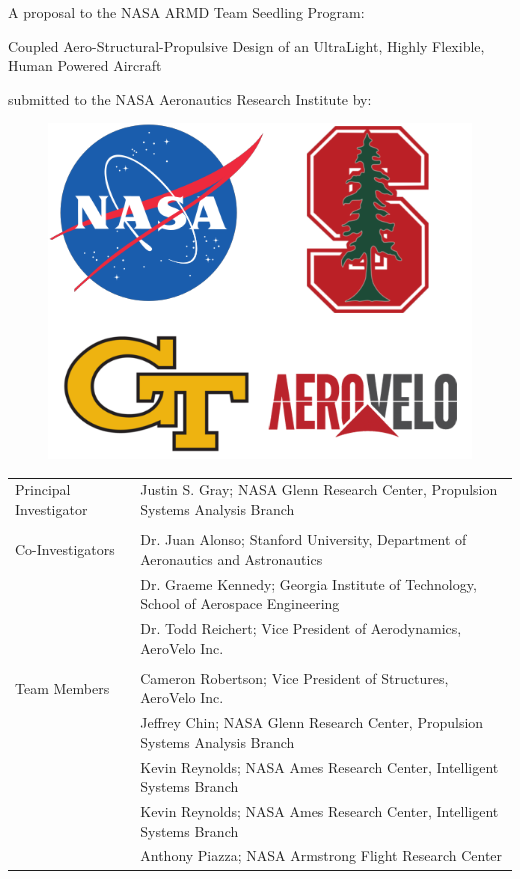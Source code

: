 \documentclass[]{aiaa-tc}
\begin{document}

  \vspace{4em}
  \begin{center}
    A proposal to the NASA ARMD Team Seedling Program: 
    \vspace{2em}

    {\Huge Coupled Aero­-Structural-Propulsive­ Design of an Ultra­Light, Highly Flexible, Human Powered Aircraft}

    \vspace{2em}
    submitted to the NASA Aeronautics Research Institute by: 

    \vspace{3em}
    \begin{figure}
        \centering
        \includegraphics[width=.5\textwidth]{images/seedling_logos}
    \end{figure}
    \vspace{3em}


  \end{center}


  \begin{tabular}{l l}
    Principal Investigator & Justin S. Gray; NASA Glenn Research Center, Propulsion Systems Analysis Branch \\ 
    & \\
    Co-Investigators & Dr. Juan Alonso; Stanford University, Department of Aeronautics and Astronautics \\
                     & Dr. Graeme Kennedy; Georgia Institute of Technology, School of Aerospace Engineering \\ 
                     & Dr. Todd Reichert; Vice President of Aerodynamics, AeroVelo Inc. \\
    & \\ 
    Team Members & Cameron Robertson; Vice President of Structures, AeroVelo Inc. \\ 
                 & Jeffrey Chin; NASA Glenn Research Center, Propulsion Systems Analysis Branch \\
                 & Kevin Reynolds; NASA Ames Research Center, Intelligent Systems Branch \\
                 & Kevin Reynolds; NASA Ames Research Center, Intelligent Systems Branch \\
                 & Anthony Piazza; NASA Armstrong Flight Research Center \\
  \end{tabular}
\end{document}
